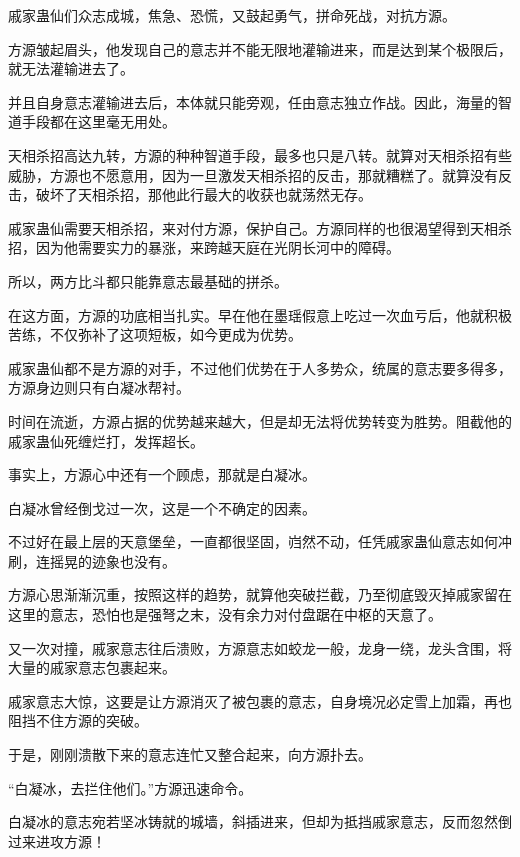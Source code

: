 
\begin{this_body}

戚家蛊仙们众志成城，焦急、恐慌，又鼓起勇气，拼命死战，对抗方源。

方源皱起眉头，他发现自己的意志并不能无限地灌输进来，而是达到某个极限后，就无法灌输进去了。

并且自身意志灌输进去后，本体就只能旁观，任由意志独立作战。因此，海量的智道手段都在这里毫无用处。

天相杀招高达九转，方源的种种智道手段，最多也只是八转。就算对天相杀招有些威胁，方源也不愿意用，因为一旦激发天相杀招的反击，那就糟糕了。就算没有反击，破坏了天相杀招，那他此行最大的收获也就荡然无存。

戚家蛊仙需要天相杀招，来对付方源，保护自己。方源同样的也很渴望得到天相杀招，因为他需要实力的暴涨，来跨越天庭在光阴长河中的障碍。

所以，两方比斗都只能靠意志最基础的拼杀。

在这方面，方源的功底相当扎实。早在他在墨瑶假意上吃过一次血亏后，他就积极苦练，不仅弥补了这项短板，如今更成为优势。

戚家蛊仙都不是方源的对手，不过他们优势在于人多势众，统属的意志要多得多，方源身边则只有白凝冰帮衬。

时间在流逝，方源占据的优势越来越大，但是却无法将优势转变为胜势。阻截他的戚家蛊仙死缠烂打，发挥超长。

事实上，方源心中还有一个顾虑，那就是白凝冰。

白凝冰曾经倒戈过一次，这是一个不确定的因素。

不过好在最上层的天意堡垒，一直都很坚固，岿然不动，任凭戚家蛊仙意志如何冲刷，连摇晃的迹象也没有。

方源心思渐渐沉重，按照这样的趋势，就算他突破拦截，乃至彻底毁灭掉戚家留在这里的意志，恐怕也是强弩之末，没有余力对付盘踞在中枢的天意了。

又一次对撞，戚家意志往后溃败，方源意志如蛟龙一般，龙身一绕，龙头含围，将大量的戚家意志包裹起来。

戚家意志大惊，这要是让方源消灭了被包裹的意志，自身境况必定雪上加霜，再也阻挡不住方源的突破。

于是，刚刚溃散下来的意志连忙又整合起来，向方源扑去。

“白凝冰，去拦住他们。”方源迅速命令。

白凝冰的意志宛若坚冰铸就的城墙，斜插进来，但却为抵挡戚家意志，反而忽然倒过来进攻方源！


\end{this_body}

